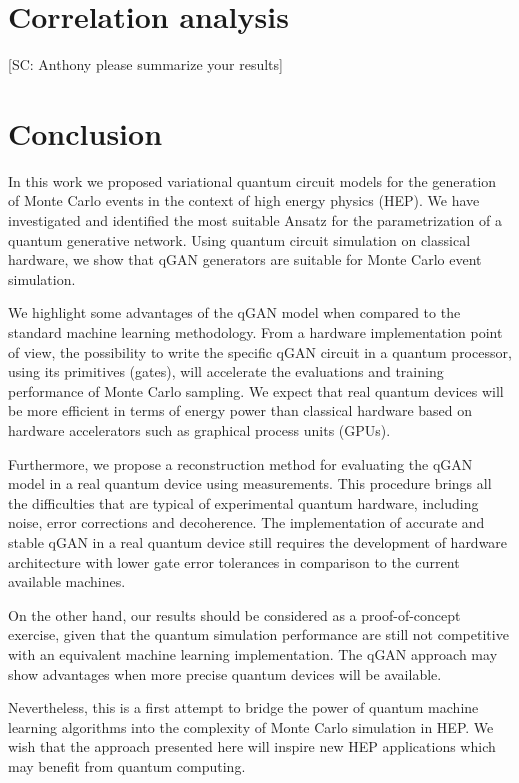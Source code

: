 \documentclass[twocolumn,preprintnumbers,superscriptaddress]{revtex4-2}
\begin{document}
\section{Correlation analysis}

 {\color{red}[SC: Anthony please summarize your results]}

\section{Conclusion}
\label{sec:conclusion}

In this work we proposed variational quantum circuit models for the generation
of Monte Carlo events in the context of high energy physics (HEP). We have
investigated and identified the most suitable Ansatz for the parametrization of
a quantum generative network. Using quantum circuit simulation on classical
hardware, we show that qGAN generators are suitable for Monte Carlo event
simulation.

We highlight some advantages of the qGAN model when compared to the standard
machine learning methodology. From a hardware implementation point of view, the
possibility to write the specific qGAN circuit in a quantum processor, using
its primitives (gates), will accelerate the evaluations and training performance
of Monte Carlo sampling. We expect that real quantum devices will be more
efficient in terms of energy power than classical hardware based on hardware
accelerators such as graphical process units (GPUs).

Furthermore, we propose a reconstruction method for evaluating the qGAN
model in a real quantum device using measurements. This procedure brings all the
difficulties that are typical of experimental quantum hardware, including noise,
error corrections and decoherence. The implementation of accurate and stable
qGAN in a real quantum device still requires the development of hardware
architecture with lower gate error tolerances in comparison to the current
available machines.

On the other hand, our results should be considered as a proof-of-concept
exercise, given that the quantum simulation performance are still not
competitive with an equivalent machine learning implementation. The qGAN
approach may show advantages when more precise quantum devices will be
available.

Nevertheless, this is a first attempt to bridge the power of quantum machine
learning algorithms into the complexity of Monte Carlo simulation in HEP. We
wish that the approach presented here will inspire new HEP applications which
may benefit from quantum computing.
\end{document}
